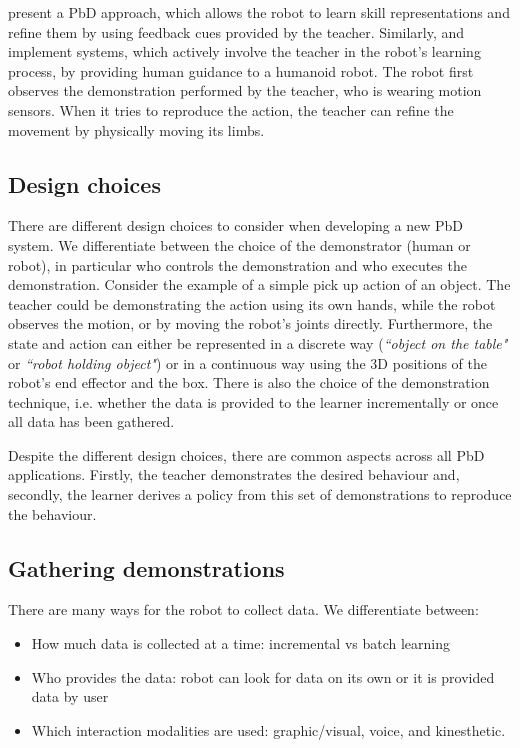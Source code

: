  \cite{nicolescu2003natural} present a PbD approach, which allows the robot to learn skill representations and refine them by using feedback cues provided by the teacher.
 Similarly, \cite{calinon2007active} and \cite{calinon2007incremental} implement systems, which actively involve the teacher in the robot's learning process, by providing human guidance to a humanoid robot.
 The robot first observes the demonstration performed by the teacher, who is wearing motion sensors.
 When it tries to reproduce the action, the teacher can refine the movement by physically moving its limbs.

\subsection{Design choices}
There are different design choices to consider when developing a new PbD system.
We differentiate between the choice of the demonstrator (human or robot), in particular who controls the demonstration and who executes the demonstration.
 Consider the example of a simple pick up action of an object.
 The teacher could be demonstrating the action using its own hands, while the robot observes the motion, or by moving the robot's joints directly.
 Furthermore, the state and action can either be represented in a discrete way (\textit{``object on the table"} or \textit{``robot holding object"}) or in a continuous way using the 3D positions of the robot's end effector and the box.
 There is also the choice of the demonstration technique, i.e. whether the data is provided to the learner incrementally or once all data has been gathered.
 
Despite the different design choices, there are common aspects across all PbD applications. Firstly, the teacher demonstrates the desired behaviour and, secondly, the learner derives a policy from this set of demonstrations to reproduce the behaviour.

\subsection{Gathering demonstrations} \label{subsec:Gathering demonstrations}
There are many ways for the robot to collect data.
 We differentiate between:
\begin{itemize}
    \item How much data is collected at a time: incremental vs batch learning
    \item Who provides the data: robot can look for data on its own or it is provided data by user
    \item Which interaction modalities are used: graphic/visual, voice, and kinesthetic. 
\end{itemize}

